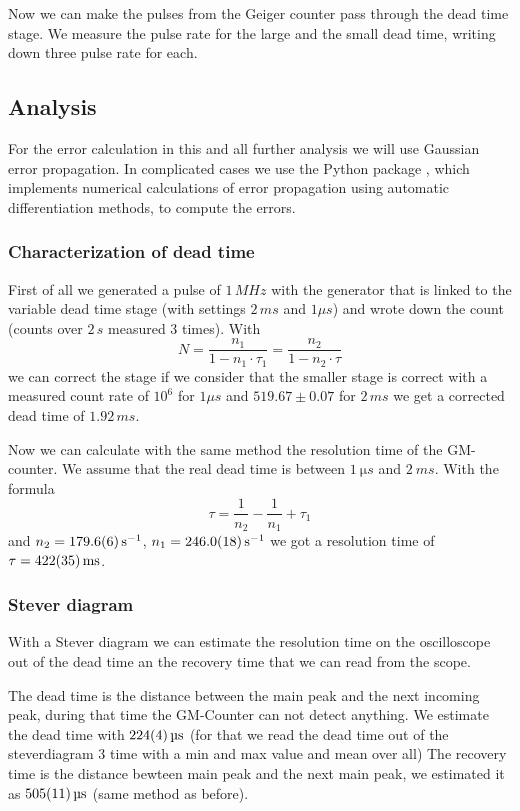 Now we can make the pulses from the Geiger counter pass through the dead time stage. We measure the pulse rate for the large and the small dead time, writing down three pulse rate for each.

\subsection{Analysis}

For the error calculation in this and all further analysis we will use Gaussian error propagation. In complicated cases we use the Python package , which implements numerical calculations of error propagation using automatic differentiation methods, to compute the errors.

\subsubsection{Characterization of dead time}

First of all we generated a pulse of $1\,MHz$ with the generator
that is linked to the variable dead time stage (with settings $2\, ms$ and $1\mu s$) and wrote down the count (counts over $2\, s$ measured $3$ times).
With
\begin{equation}
N =\frac{n_1}{1-n_1\cdot\tau_1}=\frac{n_2}{1-n_2\cdot\tau}
\end{equation}
we can correct the stage if we consider that the smaller stage is correct 
with a measured count rate of $10^6$ for $1\mu s$ and 
$519.67\pm0.07$ for $2\,ms$ we get a corrected dead time of $1.92\,ms$.

Now we can calculate with the same method the resolution time of the GM-counter.
We assume that the real dead time is between $\SI{1}{\micro s}$ and $\SI{2}{ms}$. With the formula
\begin{equation}
\tau =\frac{1}{n_2}-\frac{1}{n_1}+\tau_1
\end{equation}
and $n_2=\SI{179.6\pm0.6}{s^{-1}}$, $n_1=\SI{246.0\pm1.8}{s^{-1}}$ we got a resolution time of $\tau=\SI{422\pm35}{ms}$.

\subsubsection{Stever diagram}

With a Stever diagram we can estimate the resolution time on the oscilloscope out of the dead time an the recovery time that we can read from the scope. 

The dead time is the distance between the main peak and the next incoming peak, during that time the GM-Counter can not detect anything.
We estimate the dead time with $\SI{224 \pm 4}{\micro s}$ (for that we read the dead time out of the steverdiagram 3 time with a min and max value and mean over all)
The recovery time is the distance bewteen main peak and the next main peak, we estimated it as $\SI{505\pm11}{\micro s}$ (same method as before).

